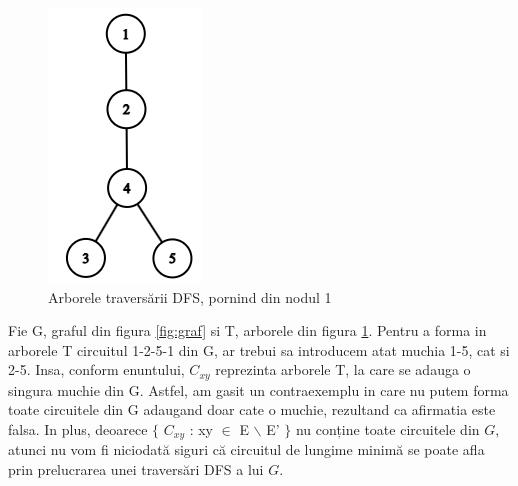\documentclass{article}
\begin{document}
\begin{figure}[h]
\begin{minipage}{0.45\textwidth}
        \includegraphics[width=\textwidth]{images/DFS_tree_cropped.png}
        \caption{Arborele traversării DFS, pornind din nodul 1}
        \label{fig:arbore}
    \end{minipage}
\end{figure}

{\fontsize{14}{16}\selectfont

Fie G, graful din figura \ref{fig:graf} si T, arborele din figura \ref{fig:arbore}. Pentru a forma in arborele T circuitul 1-2-5-1 din G, ar trebui sa introducem atat muchia 1-5, cat si 2-5. Insa, conform enuntului, $C_{xy}$ reprezinta arborele T, la care se adauga o singura muchie din G. Astfel, am gasit un contraexemplu in care nu putem forma toate circuitele din G adaugand doar cate o muchie, rezultand ca afirmatia este falsa. In plus, deoarece $\lbrace$ $C_{xy}$ : xy $\in$ E $\backslash$ E' $\rbrace$ nu conține toate circuitele din $G$, atunci nu vom fi niciodată siguri că circuitul de lungime minimă se poate afla prin prelucrarea unei traversări DFS a lui $G$.
}
\end{document}

